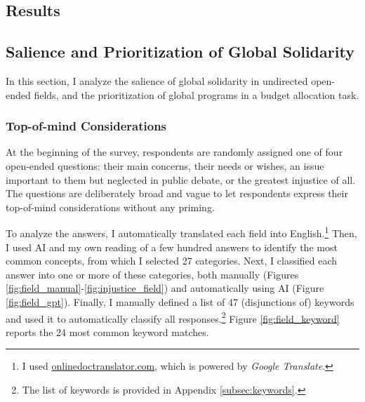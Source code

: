 \documentclass[12pt,english]{article}
\begin{document}
\begin{bibunit}
\section{Results}\label{sec:results}

\subsection{Salience and Prioritization of Global Solidarity\label{sec:salience}}
In this section, I analyze the salience of global solidarity in undirected open-ended fields, and the prioritization of global programs in a budget allocation task.

\subsubsection{Top-of-mind Considerations}\label{subsec:considerations}

At the beginning of the survey, respondents are randomly assigned one of four open-ended questions: their main concerns, their needs or wishes, an issue important to them but neglected in public debate, or the greatest injustice of all. The questions are deliberately broad and vague to let respondents express their top-of-mind considerations without any priming. 

To analyze the answers, I automatically translated each field into English.\footnote{I used \href{https://www.onlinedoctranslator.com/en/translationform}{onlinedoctranslator.com}, which is powered by \textit{Google Translate}.} 
Then, I used AI and my own reading of a few hundred answers to identify the most common concepts, from which I selected 27 categories. Next, I classified each answer into one or more of these categories, both manually (Figures \ref{fig:field_manual}-\ref{fig:injustice_field}) and automatically using AI (Figure \ref{fig:field_gpt}). Finally, I manually defined a list of 47 (disjunctions of) keywords and used it to automatically classify all responses.\footnote{The list of keywords is provided in Appendix \ref{subsec:keywords}.} Figure \ref{fig:field_keyword} reports the 24 most common keyword matches. 


\end{bibunit}
\end{document}
